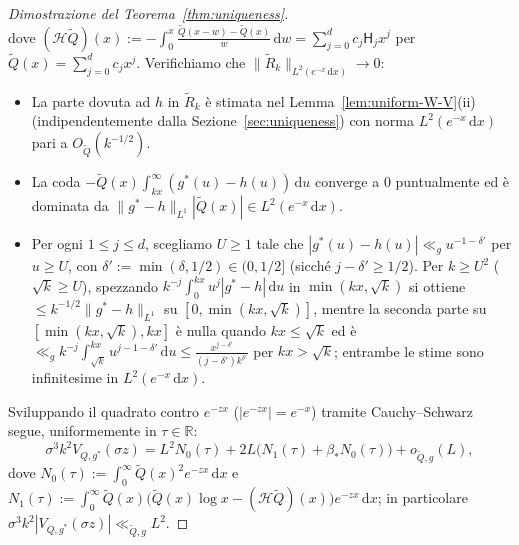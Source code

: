 \documentclass[11pt, reqno]{amsart}
\theoremstyle{remark}
\numberwithin{equation}{section}
\newcommand{\Harm}{\mathsf{H}}
\newcommand{\R}{\mathbb{R}}
\newcommand{\cH}{\mathcal{H}}
\newcommand{\dd}{\,\mathrm{d}}
\begin{document}
\begin{proof}[Dimostrazione del Teorema~\ref{thm:uniqueness}]
\[\]
dove $(\cH\widetilde{Q})(x) := -\int_0^x \frac{\widetilde{Q}(x-w)-\widetilde{Q}(x)}{w}\dd w = \sum_{j=0}^d c_j \Harm_j x^j$
per $\widetilde{Q}(x) = \sum_{j=0}^d c_j x^j$. Verifichiamo che $\|\widetilde{R}_k\|_{L^2(e^{-x}\dd x)} \to 0$:
\begin{itemize}
\item La parte dovuta ad $h$ in $\widetilde{R}_k$ è stimata nel Lemma~\ref{lem:uniform-W-V}(ii)
(indipendentemente dalla Sezione~\ref{sec:uniqueness}) con norma $L^2(e^{-x}\dd x)$ pari a $O_{\widetilde{Q}}(k^{-1/2})$.
\item La coda $-\widetilde{Q}(x)\int_{kx}^\infty (g^*(u)-h(u))\dd u$ converge a $0$ puntualmente ed è
dominata da $\|g^*-h\|_{L^1}|\widetilde{Q}(x)| \in L^2(e^{-x}\dd x)$.
\item Per ogni $1 \le j \le d$, scegliamo $U \ge 1$ tale che $|g^*(u)-h(u)| \ll_g u^{-1-\delta'}$ per
$u \ge U$, con $\delta' := \min(\delta, 1/2) \in (0, 1/2]$ (sicché $j - \delta' \ge 1/2$). Per $k \ge U^2$ ($\sqrt{k} \ge U$),
spezzando $k^{-j}\int_0^{kx} u^j |g^*-h|\dd u$ in $\min(kx, \sqrt{k})$ si ottiene $\le k^{-1/2}\|g^*-h\|_{L^1}$
su $[0, \min(kx, \sqrt{k})]$, mentre la seconda parte su $[\min(kx, \sqrt{k}), kx]$ è nulla quando
$kx \le \sqrt{k}$ ed è $\ll_g k^{-j}\int_{\sqrt{k}}^{kx} u^{j-1-\delta'}\dd u \le \frac{x^{j-\delta'}}{(j-\delta')k^{\delta'}}$
per $kx > \sqrt{k}$; entrambe le stime sono infinitesime in $L^2(e^{-x}\dd x)$.
\end{itemize}
Sviluppando il quadrato contro $e^{-zx}$ ($|e^{-zx}| = e^{-x}$) tramite Cauchy--Schwarz segue, uniformemente in $\tau \in \R$:
\begin{equation}\label{eq:Vg-exp}
\sigma^3 k^2 V_{Q, g^*}(\sigma z) = L^2 N_0(\tau) + 2L\bigl(N_1(\tau) + \beta_* N_0(\tau)\bigr) + o_{\widetilde{Q}, g}(L),
\end{equation}
dove $N_0(\tau) := \int_0^\infty \widetilde{Q}(x)^2 e^{-zx}\dd x$ e
$N_1(\tau) := \int_0^\infty \widetilde{Q}(x)\bigl(\widetilde{Q}(x)\log x - (\cH\widetilde{Q})(x)\bigr) e^{-zx}\dd x$;
in particolare $\sigma^3 k^2 |V_{Q, g^*}(\sigma z)| \ll_{\widetilde{Q}, g} L^2$.


\end{proof}
\end{document}
